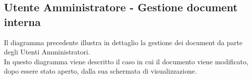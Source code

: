 \subsection{Utente Amministratore - Gestione document interna}
Il diagramma precedente illustra in dettaglio la gestione dei document da parte degli Utenti Amministratori.\\
In questo diagramma viene descritto il caso in cui il documento viene modificato, dopo essere stato aperto, dalla sua schermata di visualizzazione.